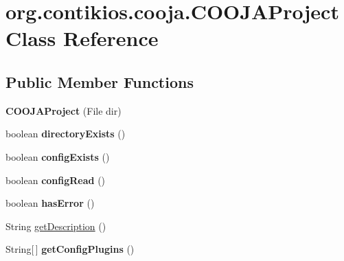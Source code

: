 \hypertarget{classorg_1_1contikios_1_1cooja_1_1COOJAProject}{\section{org.\-contikios.\-cooja.\-C\-O\-O\-J\-A\-Project Class Reference}
\label{classorg_1_1contikios_1_1cooja_1_1COOJAProject}
}
\subsection*{Public Member Functions}
\begin{DoxyCompactItemize}
\item 
\hypertarget{classorg_1_1contikios_1_1cooja_1_1COOJAProject_a23651f1dcb5b825c3f2f436828f54ae5}{{\bfseries C\-O\-O\-J\-A\-Project} (File dir)}\label{classorg_1_1contikios_1_1cooja_1_1COOJAProject_a23651f1dcb5b825c3f2f436828f54ae5}

\item 
\hypertarget{classorg_1_1contikios_1_1cooja_1_1COOJAProject_aad2d9d98dd664355f95f8c9e05f67cd2}{boolean {\bfseries directory\-Exists} ()}\label{classorg_1_1contikios_1_1cooja_1_1COOJAProject_aad2d9d98dd664355f95f8c9e05f67cd2}

\item 
\hypertarget{classorg_1_1contikios_1_1cooja_1_1COOJAProject_a053cbd50039f5b3b0d3de9753d7af244}{boolean {\bfseries config\-Exists} ()}\label{classorg_1_1contikios_1_1cooja_1_1COOJAProject_a053cbd50039f5b3b0d3de9753d7af244}

\item 
\hypertarget{classorg_1_1contikios_1_1cooja_1_1COOJAProject_aabe4b5d71efd4e97c236ea3dbba929ca}{boolean {\bfseries config\-Read} ()}\label{classorg_1_1contikios_1_1cooja_1_1COOJAProject_aabe4b5d71efd4e97c236ea3dbba929ca}

\item 
\hypertarget{classorg_1_1contikios_1_1cooja_1_1COOJAProject_acd9fdb14ac54da07cd18881fa337229a}{boolean {\bfseries has\-Error} ()}\label{classorg_1_1contikios_1_1cooja_1_1COOJAProject_acd9fdb14ac54da07cd18881fa337229a}

\item 
String \hyperlink{classorg_1_1contikios_1_1cooja_1_1COOJAProject_ade6d2947ce76f481e4458cbbb39b878a}{get\-Description} ()
\item 
\hypertarget{classorg_1_1contikios_1_1cooja_1_1COOJAProject_ab21893daa8635a07bc4cba0a4c89d7a1}{String\mbox{[}$\,$\mbox{]} {\bfseries get\-Config\-Plugins} ()}\label{classorg_1_1contikios_1_1cooja_1_1COOJAProject_ab21893daa8635a07bc4cba0a4c89d7a1}


\end{DoxyCompactItemize}

